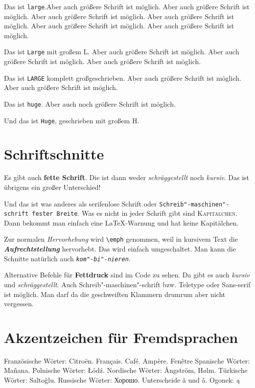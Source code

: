 {\large Das ist \texttt{large}.Aber auch größere Schrift ist möglich. Aber auch größere Schrift ist möglich. Aber auch größere Schrift ist möglich. Aber auch größere Schrift ist möglich. Aber auch größere Schrift ist möglich. Aber auch größere Schrift ist möglich.}

{\Large Das ist \texttt{Large} mit großem L. Aber auch größere Schrift ist möglich. Aber auch größere Schrift ist möglich. Aber auch größere Schrift ist möglich.}

{\LARGE Das ist \texttt{LARGE} komplett großgeschrieben. Aber auch größere Schrift ist möglich. Aber auch größere Schrift ist möglich.}

{\huge Das ist \texttt{huge}. Aber auch noch größere Schrift ist möglich.}

{\Huge Und das ist \texttt{Huge}, geschrieben mit großem H.}

\section{Schriftschnitte}

Es gibt auch \textbf{fette Schrift}. Die ist dann weder \textsl{schräggestellt} noch \textit{kursiv}. Das ist übrigens ein großer Unterschied!

Und das ist was anderes als \textsf{serifenlose Schrift} oder \texttt{Schreib"-maschinen"-schrift fester Breite}. Was es nicht in jeder Schrift gibt sind \textsc{Kapitälchen}. Dann bekommt man einfach eine \LaTeX-Warnung und hat keine Kapitälchen.

Zur normalen \emph{Hervorhebung} wird \texttt{\textbackslash emph} genommen, weil in kursivem Text die \textbf{\textit{Aufrechtstellung}} hervorhebt. Das wird einfach umgeschaltet. Man kann die Schnitte natürlich auch \textsl{\texttt{kom"-bi"-nieren}}.

Alternative Befehle für {\bfseries Fettdruck} sind im Code zu sehen. Da gibt es auch {\itshape kursiv} und {\slshape schräggestellt}. Auch {\ttfamily Schreib"-maschinen"-schrift bzw. Teletype} oder {\sffamily Sans-serif} ist möglich. Man darf da die geschweiften Klammern drumrum aber nicht vergessen.

\section{Akzentzeichen für Fremdsprachen}

Französische Wörter: Citroën. Français. Café. Ampère. Fenêtre
Spanische Wörter: Mañana.
Polnische Wörter: Łódź.
Nordische Wörter: Ångström, Hølm.
Türkische Wörter: Saltoǧlu.
Russische Wörter: Хорошо.
Unterscheide ă und ǎ.
Ogonek: ą


